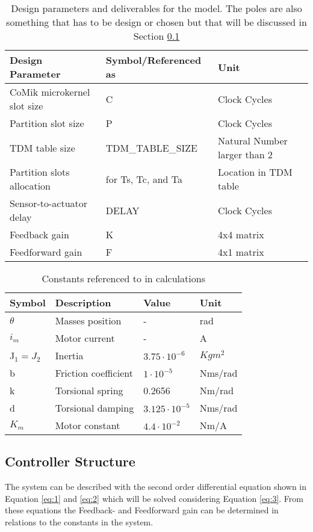 \begin{table}[h!]
	\centering
	\caption{Design parameters and deliverables for the model. The poles are also something that has to be design or chosen but that will be discussed in Section \ref{sec:controllerstructure}}
	\begin{tabular}{lll}
		\toprule
		Design Parameter & Symbol/Referenced as &Unit\\
		\midrule
		CoMik microkernel slot size& C & Clock Cycles \\
		Partition slot size& P & Clock Cycles\\
		TDM table size& TDM\_TABLE\_SIZE & Natural Number larger than 2\\
		Partition slots allocation	& for Ts, Tc, and Ta & Location in TDM table \\
		Sensor-to-actuator	delay& DELAY & Clock Cycles	\\
		Feedback gain& K & 4x4 matrix \\
		Feedforward gain& F & 4x1 matrix \\
		\midrule		
	\end{tabular}
	\label{tab:design}
\end{table}

\begin{table}[htbp]
	\centering
	\caption{Constants referenced to in calculations}
	\begin{tabular}{llll}
		\toprule
		Symbol & Description & Value & Unit\\ 
		\midrule
		$\theta$ & Masses position  & -&rad \\ 
		$i_m$ & Motor current  & - &A \\ 
		J$_1 = J_2$ & Inertia  & $3.75\cdot10^{-6}$&$Kgm^2$  \\ 
		b & Friction  coefficient   &$ 1\cdot10^{-5} $&Nms/rad\\ 
		k & Torsional spring  & 0.2656 &Nm/rad\\
		d & Torsional damping  & $3.125\cdot10^{-5}$&Nms/rad \\ 
		$K_m$ & Motor constant  & $4.4\cdot10^{-2}$&Nm/A  \\ 
		\midrule
	\end{tabular}
	\label{}
\end{table}

 

\subsection{Controller Structure}
 \label{sec:controllerstructure}
The system can be described with the second order differential equation shown in Equation \ref{eq:1} and \ref{eq:2} which will be solved considering Equation \ref{eq:3}. From these equations the Feedback- and Feedforward gain can be determined in relations to the constants in the system.

